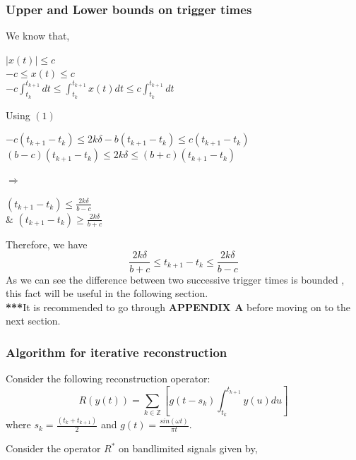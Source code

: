 \documentclass{article}
\begin{document}
\subsubsection{Upper and Lower bounds on trigger times}
We know that,
\begin{center}
    $|x(t)| \leq c$\\
    $-c \leq x(t) \leq c$\\
    $\displaystyle-c\int_{t_k}^{t_{k+1}}dt \leq \int_{t_k}^{t_{k+1}}x(t)dt \leq c\int_{t_k}^{t_{k+1}}dt$\\
\end{center}    
Using $(1)$
\begin{center}
    $-c(t_{k+1}-t_k) \leq 2k\delta - b(t_{k+1}-t_k) \leq c(t_{k+1}-t_k)$
    \\
    $(b-c)(t_{k+1}-t_k) \leq 2k\delta \leq (b+c)(t_{k+1}-t_k)$
\end{center}
$\Rightarrow$
\begin{center}
    $(t_{k+1} - t_k) \leq \frac{2k\delta}{b-c}$\\
    \& $(t_{k+1}-t_k) \geq \frac{2k\delta}{b+c}$
\end{center}
Therefore, we have
\begin{equation}
    \frac{2k\delta}{b+c} \leq t_{k+1} - t_k \leq \frac{2k\delta}{b-c}
\end{equation}
As we can see the difference between two successive trigger times is bounded , this fact will be useful in the following section.
\vspace{0.2cm}\\
\textbf{***}It is recommended to go through \textbf{APPENDIX A} before moving on to the next section.

\subsubsection{Algorithm for iterative reconstruction}
Consider the following reconstruction operator:\\
\begin{equation}
    R(y(t)) = \sum_{k\in\mathbb{Z}}[g(t-s_k)\int_{t_k}^{t_{k+1}}y(u)du]
\end{equation}
where $s_k = \frac{(t_k+t_{k+1})}{2}$ and $g(t) = \frac{sin(\omega t)}{\pi t}$.
\vspace{0.2cm}\\
\begin{flushleft}
Consider the operator $R^*$ on bandlimited signals given by,
\end{flushleft}
\end{document}
